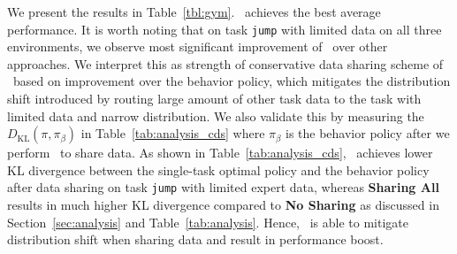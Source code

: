 We present the results in Table~\ref{tbl:gym}. \methodname\ achieves the best average performance. It is worth noting that on task \texttt{jump} with limited data on all three environments, we observe most significant improvement of \methodname\ over other approaches. We interpret this as strength of conservative data sharing scheme of \methodname\ based on improvement over the behavior policy, which mitigates the distribution shift introduced by routing large amount of other task data to the task with limited data and narrow distribution. We also validate this by measuring the $D_\text{KL}(\pi, \pi_\beta)$ in Table~\ref{tab:analysis_cds} where $\pi_\beta$ is the behavior policy after we perform \methodname\ to share data. As shown in Table~\ref{tab:analysis_cds}, \methodname\ achieves lower KL divergence between the single-task optimal policy and the behavior policy after data sharing on task \texttt{jump} with limited expert data, whereas \textbf{Sharing All} results in much higher KL divergence compared to \textbf{No Sharing} as discussed in Section~\ref{sec:analysis} and Table~\ref{tab:analysis}. Hence, \methodname\ is able to mitigate distribution shift when sharing data and result in performance boost.
